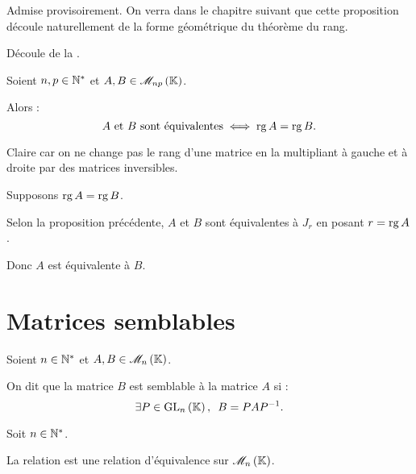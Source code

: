 \begin{dem}
\impdir Admise provisoirement. On verra dans le chapitre suivant que cette proposition découle naturellement de la forme géométrique du théorème du rang.

\imprec Découle de la .
\end{dem}

\begin{cor}
Soient \(n,p\in\mathbb{N}^*\) et \(A,B\in\M{np}\).

Alors : \[A\text{ et }B\text{ sont équivalentes}\iff\operatorname{rg} A=\operatorname{rg} B.\]
\end{cor}

\begin{dem}
\impdir Claire car on ne change pas le rang d'une matrice en la multipliant à gauche et à droite par des matrices inversibles.

\imprec

Supposons \(\operatorname{rg} A=\operatorname{rg} B\).

Selon la proposition précédente, \(A\) et \(B\) sont équivalentes à \(J_r\) en posant \(r=\operatorname{rg} A\).

Donc \(A\) est équivalente à \(B\).
\end{dem}

\section{Matrices semblables}

\begin{defi}
Soient \(n\in\mathbb{N}^*\) et \(A,B\in\M{n}\).

On dit que la matrice \(B\) est semblable à la matrice \(A\) si : \[\quantifs{\exists P\in\GL{n}}B=PAP\inv.\]
\end{defi}

\begin{prop}
Soit \(n\in\mathbb{N}^*\).

La relation  est une relation d'équivalence sur \(\M{n}\).
\end{prop}

